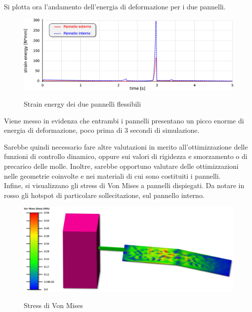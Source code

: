 \documentclass{article}
\begin{document}
        \clearpage

        Si plotta ora l'andamento dell'energia di deformazione per i due pannelli.

            \begin{figure}[h!]
                 \label{fig:strain_energy}
                \includegraphics[width=\textwidth]{MUL2/Esercitazione4/strain_energy.eps}
                \caption{Strain energy dei due pannelli flessibili}
            \end{figure}

        Viene messo in evidenza che entrambi i pannelli presentano un picco enorme di energia di deformazione,
        poco prima di 3 secondi di simulazione.
        
        Sarebbe quindi necessario fare altre valutazioni in merito all'ottimizzazione delle funzioni
        di controllo dinamico, oppure sui valori di rigidezza e smorzamento o di precarico delle molle.
        Inoltre, sarebbe opportuno valutare delle ottimizzazioni nelle geometrie coinvolte 
        e nei materiali di cui sono costituiti i pannelli. \\ 

        Infine, si visualizzano gli stress di Von Mises a pannelli dispiegati. Da notare
        in rosso gli hotspot di particolare sollecitazione, sul pannello interno.

        \begin{figure}[h!]
             \label{fig:von_mises}
            \includegraphics[width=\textwidth]{MUL2/Esercitazione4/von_mises.eps}
            \caption{Stress di Von Mises}
        \end{figure}

        \clearpage
        \printbibliography
\end{document}
